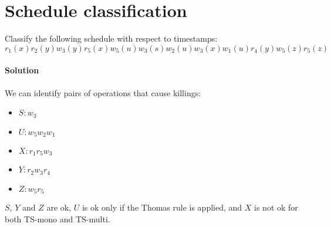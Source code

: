 \section{Schedule classification}

Classify the following schedule with respect to timestamps: 
\[r_1(x) r_2(y) w_3(y) r_5(x) w_5(u) w_3(s) w_2(u) w_3(x) w_1(u) r_4(y) w_5(z) r_5(z)\]

\paragraph*{Solution}
We can identify pairs of operations that cause killings:
\begin{itemize}
    \item $S:w_3$
    \item $U:w_5w_2w_1$
    \item $X:r_1r_5w_3$
    \item $Y:r_2w_3r_4$
    \item $Z:w_5r_5$
\end{itemize}
$S$, $Y$ and $Z$ are ok, $U$ is ok only if the Thomas rule is applied, and $X$ is not ok for both TS-mono and TS-multi. 